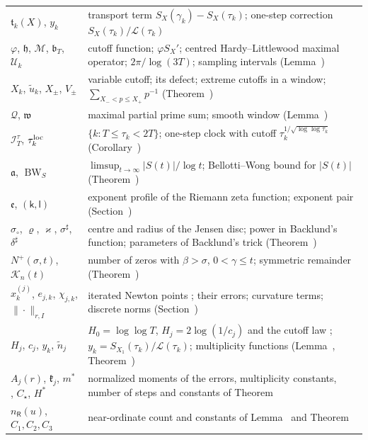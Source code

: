 \documentclass[preprint,12pt]{elsarticle}
\makeatletter
\let\CG@origref\ref
\let\CG@origeqref\eqref
\newcommand{\CG@gettip}[1]{\@ifundefined{CGTip@#1}{Reference: #1}{\csname CGTip@#1\endcsname}}
\DeclareRobustCommand{\CGref}[1]{\pdftooltip{\CG@origref{#1}}{\CG@gettip{#1}}}
\DeclareRobustCommand{\CGeqref}[1]{\pdftooltip{\CG@origeqref{#1}}{\CG@gettip{#1}}}
\numberwithin{equation}{section}
\theoremstyle{plain}
\theoremstyle{definition}
\theoremstyle{remark}
\newcommand{\lL}{\mathcal L}
\newcommand{\BWS}{\operatorname{BW}_S}
\makeatother
\begin{document}
\begin{center}
\begin{longtable}{p{}p{}}
$\mathfrak t_k(X)$, $y_k$ & transport term $S_X(\gamma_k)-S_X(\tau_k)$; one-step correction $S_X(\tau_k)/\lL(\tau_k)$\\
$\varphi$, $\mathfrak h$, $\mathcal M$, $\mathfrak b_T$, $\mathcal U_k$ & cutoff function; $\varphi S_X'$; centred Hardy--Littlewood maximal operator; $2\pi/\log(3T)$; sampling intervals (Lemma~\CGref{lem:transport})\\
$X_k$, $\tilde u_k$, $X_\pm$, $V_\pm$ & variable cutoff; its defect; extreme cutoffs in a window; $\sum_{X_-<p\le X_+}p^{-1}$ (Theorem~\CGref{thm:variable_cutoff})\\
$\mathcal Q$, $\mathfrak w$ & maximal partial prime sum; smooth window (Lemma~\CGref{lem:maximal_primes})\\
$\mathcal I_T^\tau$, $\tau_k^{\rm loc}$ & $\{k:T\le\tau_k<2T\}$; one-step clock with cutoff $\tau_k^{1/\sqrt{\log\log\tau_k}}$ (Corollary~\CGref{cor:local_clock})\\
$\mathfrak a$, $\BWS$ & $\limsup_{t\to\infty}|S(t)|/\log t$; Bellotti--Wong bound for $|S(t)|$ (Theorem~\CGref{thm:known_BW})\\
$\mathfrak e$, $(\mathsf k,\mathsf l)$ & exponent profile of the Riemann zeta function; exponent pair (Section~\CGref{sec:envelope})\\
$\sigma_\circ$, $\varrho$, $\varkappa$, $\sigma^\sharp$, $\delta^\sharp$ & centre and radius of the Jensen disc; power in Backlund's function; parameters of Backlund's trick (Theorem~\CGref{thm:known_backlund})\\
$N^+(\sigma,t)$, $\mathcal K_n(t)$ & number of zeros with $\beta>\sigma$, $0<\gamma\le t$; symmetric remainder (Theorem~\CGref{thm:landau_line})\\
$x^{(j)}_k$, $e_{j,k}$, $\chi_{j,k}$, $\|\cdot\|_{r,I}$ & iterated Newton points \CGeqref{eq:newton_iteration}; their errors; curvature terms; discrete norms (Section~\CGref{sec:iteration})\\
$H_j$, $c_j$, $y_k$, $\tilde n_j$ & $H_0=\log\log T$, $H_j=2\log(1/c_j)$ and the cutoff law \CGeqref{eq:cutoff_law}; $y_k=S_{X_1}(\tau_k)/\lL(\tau_k)$; multiplicity functions (Lemma~\CGref{lem:multiplicity}, Theorem~\CGref{thm:multiplicity_all})\\
$A_j(r)$, $\mathfrak k_j$, $m^*$, $C_\star$, $H^*$ & normalized moments of the errors, multiplicity constants, number of steps and constants of Theorem~\CGref{thm:uniform_iteration}\\
$n_{\mathsf R}(u)$, $C_1,C_2,C_3$ & near-ordinate count and constants of Lemma~\CGref{lem:zero_pairs} and Theorem~\CGref{thm:multiplicity_all}\\

\end{longtable}
\end{center}
\end{document}
